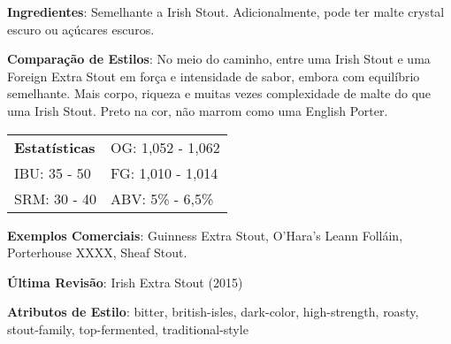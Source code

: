 \textbf{Ingredientes}: Semelhante a Irish Stout. Adicionalmente, pode ter malte crystal escuro ou açúcares escuros.

\textbf{Comparação de Estilos}: No meio do caminho, entre uma Irish Stout e uma Foreign Extra Stout em força e intensidade de sabor, embora com equilíbrio semelhante. Mais corpo, riqueza e muitas vezes complexidade de malte do que uma Irish Stout. Preto na cor, não marrom como uma English Porter.

\begin{tabular}{@{}p{35mm}p{35mm}@{}}
  \textbf{Estatísticas} & OG: 1,052 - 1,062 \\
  IBU: 35 - 50  & FG: 1,010 - 1,014 \\
  SRM: 30 - 40  & ABV: 5\% - 6,5\%
\end{tabular}

\textbf{Exemplos Comerciais}: Guinness Extra Stout, O'Hara's Leann Folláin, Porterhouse XXXX, Sheaf Stout.

\textbf{Última Revisão}: Irish Extra Stout (2015)

\textbf{Atributos de Estilo}: bitter, british-isles, dark-color, high-strength, roasty, stout-family, top-fermented, traditional-style
